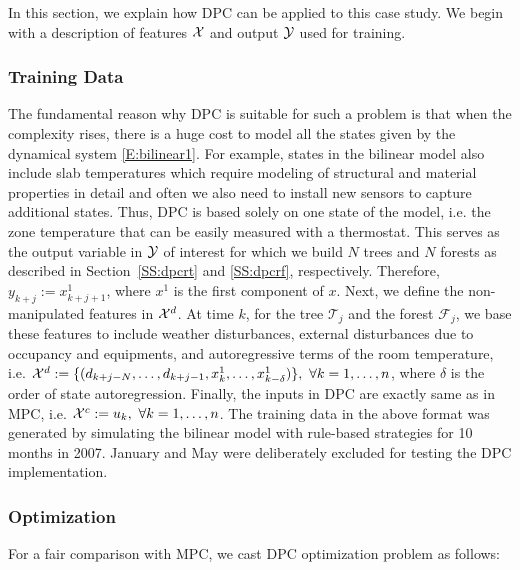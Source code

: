 In this section, we explain how DPC can be applied to this case study. We begin with a description of features $\mathcal{X}$ and output $\mathcal{Y}$ used for training.

\subsubsection{Training Data} 
\label{SSS:dpc_data}

The fundamental reason why DPC  is suitable for such a problem is that when the complexity rises, there is a huge cost to model all the states given by the dynamical system \eqref{E:bilinear1}. For example, states in the bilinear model also include slab temperatures which require modeling of structural and material properties in detail and often we also need to install new sensors to capture additional states. Thus, DPC is based solely on one state of the model, i.e. the zone temperature that can be easily measured with a thermostat. This serves as the output variable in $\mathcal{Y}$ of interest for which we build $N$ trees and $N$ forests as described in Section~\ref{SS:dpcrt} and \ref{SS:dpcrf}, respectively. Therefore, $y_{k+j}:=x_{k+j+1}^1$, where $x^1$ is the first component of $x$.
Next, we define the non-manipulated features in $\mathcal{X}^d$. At time $k$, for the tree $\mathcal{T}_j$ and the forest $\mathcal{F}_j$, we base these features to include weather disturbances, external disturbances due to occupancy and equipments, and autoregressive terms of the room temperature, i.e.
$\X^d:=\{( d_{k+j-N} ,\ldots,d_{k+j-1}, x_{k}^1,\ldots, x_{k-\delta}^1 )\},\ \forall k=1,\ldots,n$, where $\delta$ is the order of state autoregression.
Finally, the inputs in DPC are exactly same as in MPC, i.e. $\X^c:=u_k,\ \forall k=1,\ldots,n$.
The training data in the above format was generated by simulating the bilinear model with rule-based strategies for 10 months in 2007. January and May were deliberately excluded for testing the DPC implementation.
\subsubsection{Optimization} 
\label{SSS:dpc_opt}
For a fair comparison with MPC, we cast DPC optimization problem as follows:

